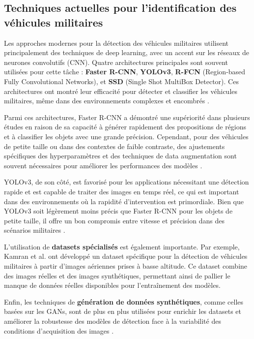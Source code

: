 \subsection{Techniques actuelles pour l'identification des véhicules militaires}

Les approches modernes pour la détection des véhicules militaires utilisent principalement des techniques de deep learning, avec un accent sur les réseaux de neurones convolutifs (CNN). Quatre architectures principales sont souvent utilisées pour cette tâche : \textbf{Faster R-CNN}, \textbf{YOLOv3}, \textbf{R-FCN} (Region-based Fully Convolutional Networks), et \textbf{SSD} (Single Shot MultiBox Detector). Ces architectures ont montré leur efficacité pour détecter et classifier les véhicules militaires, même dans des environnements complexes et encombrés \cite{kamran2020, gupta2021}.

Parmi ces architectures, Faster R-CNN a démontré une supériorité dans plusieurs études en raison de sa capacité à générer rapidement des propositions de régions et à classifier les objets avec une grande précision. Cependant, pour des véhicules de petite taille ou dans des contextes de faible contraste, des ajustements spécifiques des hyperparamètres et des techniques de data augmentation sont souvent nécessaires pour améliorer les performances des modèles \cite{gupta2021}.

YOLOv3, de son côté, est favorisé pour les applications nécessitant une détection rapide et est capable de traiter des images en temps réel, ce qui est important dans des environnements où la rapidité d'intervention est primordiale. Bien que YOLOv3 soit légèrement moins précis que Faster R-CNN pour les objets de petite taille, il offre un bon compromis entre vitesse et précision dans des scénarios militaires \cite{gupta2021}.

L'utilisation de \textbf{datasets spécialisés} est également importante. Par exemple, Kamran et al. \cite{kamran2020} ont développé un dataset spécifique pour la détection de véhicules militaires à partir d'images aériennes prises à basse altitude. Ce dataset combine des images réelles et des images synthétiques, permettant ainsi de pallier le manque de données réelles disponibles pour l'entraînement des modèles.

Enfin, les techniques de \textbf{génération de données synthétiques}, comme celles basées sur les GANs, sont de plus en plus utilisées pour enrichir les datasets et améliorer la robustesse des modèles de détection face à la variabilité des conditions d'acquisition des images \cite{spie2020}.


